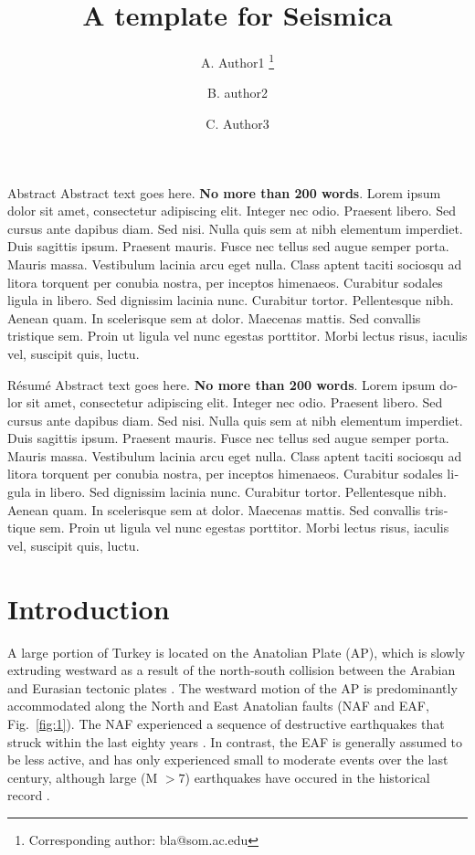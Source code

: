 \documentclass[breakmath]{seismica}
\title{A template for Seismica}
\author[1]{A. Author1
	\orcid{0000-0002-1825-0097}
	\thanks{Corresponding author: bla@som.ac.edu}}
\author[1]{B. author2 
	\orcid{0000-0002-1825-0097}}
\author[2]{C. Author3
	\orcid{0000-0002-1825-0097}}
\affil[1]{affil Author 1 and 2 }
\affil[2]{affil author 3}
\begin{document}
	
	\makeseistitle
	{%
	\begin{summary}{Abstract}
		Abstract text goes here. \textbf{No more than 200 words}. Lorem ipsum dolor sit amet, consectetur adipiscing elit. Integer nec odio. Praesent libero. Sed cursus ante dapibus diam. Sed nisi. Nulla quis sem at nibh elementum imperdiet. Duis sagittis ipsum. Praesent mauris. Fusce nec tellus sed augue semper porta. Mauris massa. Vestibulum lacinia arcu eget nulla. Class aptent taciti sociosqu ad litora torquent per conubia nostra, per inceptos himenaeos. Curabitur sodales ligula in libero. Sed dignissim lacinia nunc. Curabitur tortor. Pellentesque nibh. Aenean quam. In scelerisque sem at dolor. Maecenas mattis. Sed convallis tristique sem. Proin ut ligula vel nunc egestas porttitor. Morbi lectus risus, iaculis vel, suscipit quis, luctu.
	\end{summary}
	\begin{french}
	\begin{summary}{Résumé}
		Abstract text goes here. \textbf{No more than 200 words}. Lorem ipsum dolor sit amet, consectetur adipiscing elit. Integer nec odio. Praesent libero. Sed cursus ante dapibus diam. Sed nisi. Nulla quis sem at nibh elementum imperdiet. Duis sagittis ipsum. Praesent mauris. Fusce nec tellus sed augue semper porta. Mauris massa. Vestibulum lacinia arcu eget nulla. Class aptent taciti sociosqu ad litora torquent per conubia nostra, per inceptos himenaeos. Curabitur sodales ligula in libero. Sed dignissim lacinia nunc. Curabitur tortor. Pellentesque nibh. Aenean quam. In scelerisque sem at dolor. Maecenas mattis. Sed convallis tristique sem. Proin ut ligula vel nunc egestas porttitor. Morbi lectus risus, iaculis vel, suscipit quis, luctu.
	\end{summary}
	\end{french}
	}
	

	\section{Introduction}
	
	A large portion of Turkey is located on the Anatolian Plate (AP), which is slowly extruding westward as a result of the north-south collision between the Arabian and Eurasian tectonic plates \citep{mckenzie_plate_1970,mckenzie_active_1972,mcclusky_global_2000}. The westward motion of the AP is predominantly accommodated along the North and East Anatolian faults (NAF and EAF, Fig.~\ref{fig:1}). The NAF experienced a sequence of destructive earthquakes that struck within the last eighty years \citep{barka_slip_1996,stein_progressive_1997,armijo_westward_1999,sengor_north_2005}. In contrast, the EAF is generally assumed to be less active, and has only experienced small to moderate events over the last century, although large (M $> 7$) earthquakes have occured in the historical record \citep{ambraseys_characteristic_1970,ambraseys_faulting_1998,hubert-ferrari_3800_2020}.
	
\end{document}
